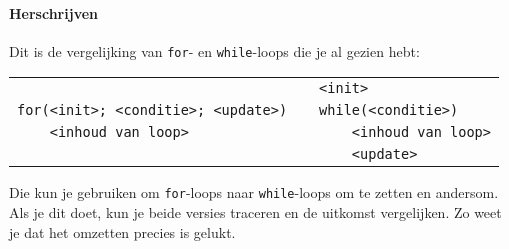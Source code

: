\paragraph{Herschrijven} Dit is de vergelijking van \texttt{for}- en \texttt{while}-loops die je al gezien hebt:

\begin{tabular}{lp{4em}l}
                                         && \verb|<init>| \\
\verb|for(<init>|\verb|; <conditie>|\verb|; <update>|\verb|)|
&& \verb|while|\verb|(<conditie>)| \\
\verb|    <inhoud van loop>|             && \verb|    <inhoud van loop>| \\
                                         && \verb|    |\verb|<update>|
\end{tabular}

Die kun je gebruiken om \texttt{for}-loops naar \texttt{while}-loops om te zetten en andersom. Als je dit doet, kun je beide versies traceren en de uitkomst vergelijken. Zo weet je dat het omzetten precies is gelukt.
